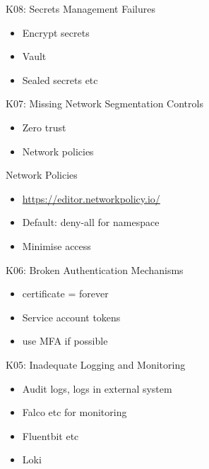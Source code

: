 \documentclass{dcpresentation}
\begin{document}
\begin{frame}{K08: Secrets Management Failures}
 \begin{itemize}
  \item Encrypt secrets
  \item Vault
  \item Sealed secrets etc
 \end{itemize}
\end{frame}


\begin{frame}{K07: Missing Network Segmentation Controls}
 \begin{itemize}
  \item Zero trust 
  \item Network policies
 \end{itemize}
\end{frame}

\begin{frame}{Network Policies}
 \begin{itemize}
  \item \url{https://editor.networkpolicy.io/}
  \item Default: deny-all for namespace
  \item Minimise access
 \end{itemize}
 
\end{frame}

\begin{frame}{K06: Broken Authentication Mechanisms}
 \begin{itemize}
  \item certificate = forever
  \item Service account tokens
  \item use MFA if possible
 \end{itemize}
\end{frame}


\begin{frame}{K05: Inadequate Logging and Monitoring}
 \begin{itemize}
  \item Audit logs, logs in external system
  \item Falco etc for monitoring
  \item Fluentbit etc
  \item Loki
 \end{itemize}
\end{frame}
\end{document}
